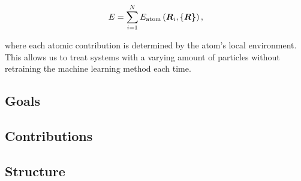 \begin{equation}
E = \sum_{i=1}^N E_{\text{atom}}\left(\bm{R}_i, \left\{\bm{R\right\}} \right) ,
\end{equation}

where each atomic contribution is determined by the atom's
local environment. This allows us to treat systems with
a varying amount of particles without retraining
the machine learning method each time.

\subsection{Goals}

\subsection{Contributions}

\subsection{Structure}
